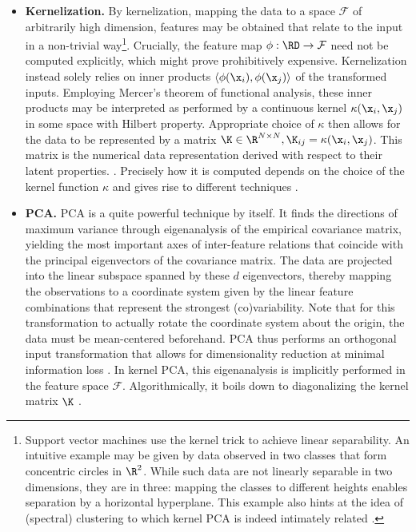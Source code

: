 \begin{itemize}

  \item[] \textbf{Kernelization.} By kernelization, mapping the data to a 
  space $\mathcal{F}$ of arbitrarily high dimension, features may be obtained 
  that relate to the input in a non-trivial way\footnote{
  Support vector machines use the kernel trick to achieve linear separability. 
  An intuitive example may be given by data observed in two classes that form 
  concentric circles in $\R^2$. 
  While such data are not linearly separable in two dimensions, they are in three: 
  mapping the classes to different heights enables separation by a horizontal 
  hyperplane.
  This example also hints at the idea of (spectral) clustering to which kernel 
  PCA is indeed intimately related \citep{bengioetal2004}.
  }.
  Crucially, the feature map $\phi: \RD \rightarrow \mathcal{F}$ need not be 
  computed explicitly, which might prove prohibitively expensive.
  Kernelization instead solely relies on inner products $\langle \phi(\x_i), 
  \phi(\x_j) \rangle$ of the transformed inputs.
  Employing Mercer's theorem of functional analysis, these inner products may 
  be interpreted as performed by a continuous kernel 
  $\kappa(\x_i, \x_j)$ in some space with Hilbert property.
  Appropriate choice of $\kappa$ then allows for the data to be represented by a 
  matrix $\K \in \R^{N \times N}, \K_{ij} = \kappa(\x_i, \x_j)$.
  This matrix is the numerical data representation derived with respect to their 
  latent properties. \citep{schoelkopfetal1998}.
  Precisely how it is computed depends on the choice of the kernel function 
  $\kappa$ and gives rise to different techniques \citep{hametal2003}.
  
  \item[] \textbf{PCA.} PCA is a quite powerful technique by itself.
  It finds the directions of maximum variance through eigenanalysis of the 
  empirical covariance matrix, yielding the most important axes of inter-feature 
  relations that coincide with the principal eigenvectors of the covariance 
  matrix.
  The data are projected into the linear subspace spanned by these $d$ 
  eigenvectors, thereby mapping the observations to a coordinate system given 
  by the linear feature combinations that represent the strongest 
  (co)variability.
  Note that for this transformation to actually rotate the coordinate system 
  about the origin, the data must be mean-centered beforehand.
  PCA thus performs an orthogonal input transformation that allows for 
  dimensionality reduction at minimal information loss \citep{cayton2005}.
  In kernel PCA, this eigenanalysis is implicitly performed in the feature space 
  $\mathcal{F}$.
  Algorithmically, it boils down to diagonalizing the kernel matrix $\K$ 
  \citep{schoelkopfetal1998}.
 
\end{itemize}

